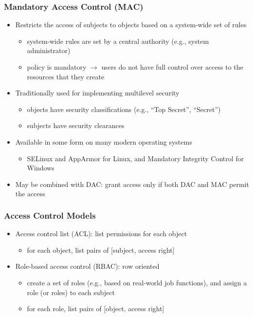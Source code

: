 \documentclass[final]{article}
\begin{document}
\subsubsection*{Mandatory Access Control (MAC)}
\begin{itemize}[nosep]
    \item Restricts the access of subjects to objects based on a system-wide set of rules
          \begin{itemize}[nosep]
              \item system-wide rules are set by a central authority (e.g., system administrator)
              \item policy is mandatory $\rightarrow$ users do not have full control over access to the resources that they create
          \end{itemize}
    \item Traditionally used for implementing multilevel security
          \begin{itemize}[nosep]
              \item objects have security classifications (e.g., “Top Secret”, “Secret”)
              \item subjects have security clearances
          \end{itemize}
    \item Available in some form on many modern operating systems
          \begin{itemize}[nosep]
              \item SELinux and AppArmor for Linux, and Mandatory Integrity Control for Windows
          \end{itemize}
    \item May be combined with DAC: grant access only if both DAC and MAC permit the access
\end{itemize}
\subsubsection*{Access Control Models}
\begin{itemize}[nosep]
    \item Access control list (ACL): list permissions for each object
          \begin{itemize}[nosep]
              \item for each object, list pairs of [subject, access right]
          \end{itemize}
    \item Role-based access control (RBAC): row oriented
          \begin{itemize}[nosep]
              \item create a set of roles (e.g., based on real-world job functions), and assign a role (or roles) to each subject
              \item for each role, list pairs of [object, access right]
          \end{itemize}
\end{itemize}
\end{document}
